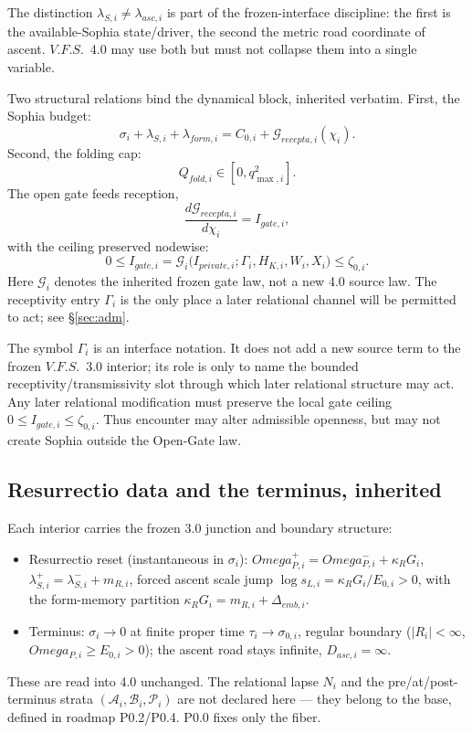 \documentclass[11pt,a4paper]{article}
\def\Omega{Omega}%
\def\mathrm#1{#1}%
\def\emph#1{#1}%
\newcommand{\VFS}{\ensuremath{\mathrm{V.F.S.}}}
\theoremstyle{definition}
\theoremstyle{plain}
\theoremstyle{remark}
\begin{document}
The distinction $\lambda_{S,i}\neq\lambda_{\mathrm{asc},i}$ is part of the
frozen-interface discipline: the first is the available-Sophia state/driver, the
second the metric road coordinate of ascent. \VFS\ 4.0 may use both but must not
collapse them into a single variable.

Two structural relations bind the dynamical block, inherited verbatim. First, the
Sophia budget:
\[
\sigma_i+\lambda_{S,i}+\lambda_{\mathrm{form},i}
=
C_{0,i}+\mathcal{G}_{\mathrm{recepta},i}(\chi_i).
\]
Second, the folding cap:
\[
Q_{\mathrm{fold},i}\in[0,q^2_{\max,i}].
\]
The open gate feeds reception,
\[
\frac{d\mathcal{G}_{\mathrm{recepta},i}}{d\chi_i}=I_{\mathrm{gate},i},
\]
with the ceiling preserved nodewise:
\[
0\leq I_{\mathrm{gate},i}
=\mathcal{G}_i\bigl(I_{\mathrm{private},i};\Gamma_i,H_{K,i},W_i,X_i\bigr)
\leq\zeta_{0,i}.
\]
Here $\mathcal G_i$ denotes the inherited frozen gate law, not a new 4.0 source law.
The receptivity entry $\Gamma_i$ is the only place a later relational channel will be
permitted to act; see \S\ref{sec:adm}.

The symbol $\Gamma_i$ is an interface notation. It does not add a new source term to
the frozen \VFS\ 3.0 interior; its role is only to name the bounded
receptivity/transmissivity slot through which later relational structure may act.
Any later relational modification must preserve the local gate ceiling
$0\leq I_{\mathrm{gate},i}\leq\zeta_{0,i}$. Thus encounter may alter admissible
openness, but may not create Sophia outside the Open-Gate law.

\subsection{Resurrectio data and the terminus, inherited}

Each interior carries the frozen 3.0 junction and boundary structure:
\begin{itemize}[leftmargin=1.3cm]
\item Resurrectio reset (instantaneous in $\sigma_i$): $\Omega_{P,i}^+=\Omega_{P,i}^-+\kappa_RG_i$, $\lambda_{S,i}^+=\lambda_{S,i}^-+m_{R,i}$, forced ascent scale jump $\log s_{L,i}=\kappa_RG_i/E_{0,i}>0$, with the form-memory partition $\kappa_RG_i=m_{R,i}+\Delta_{\mathrm{emb},i}$.
\item Terminus: $\sigma_i\to0$ at finite proper time $\tau_i\to\sigma_{0,i}$, regular boundary ($|R_i|<\infty$, $\Omega_{P,i}\geq E_{0,i}>0$); the ascent road stays infinite, $D_{\mathrm{asc},i}=\infty$.
\end{itemize}
These are read into 4.0 unchanged. The relational \emph{lapse} $N_i$ and the
pre/at/post-terminus strata $(\mathcal A_i,\mathcal B_i,\mathcal P_i)$ are
\emph{not} declared here --- they belong to the base, defined in roadmap P0.2/P0.4.
P0.0 fixes only the fiber.
\end{document}
